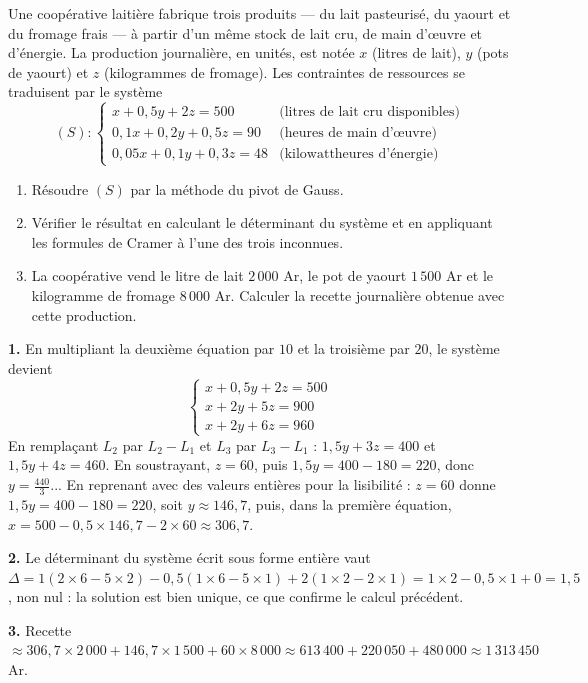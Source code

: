 \begin{jecherche}
Une coopérative laitière fabrique trois produits — du lait pasteurisé, du
yaourt et du fromage frais — à partir d'un même stock de lait cru, de main
d'œuvre et d'énergie. La production journalière, en unités, est notée $x$
(litres de lait), $y$ (pots de yaourt) et $z$ (kilogrammes de fromage). Les
contraintes de ressources se traduisent par le système
\[
  (S) : \begin{cases}
    x + 0{,}5y + 2z = 500 & \text{(litres de lait cru disponibles)} \\
    0{,}1x + 0{,}2y + 0{,}5z = 90 & \text{(heures de main d'œuvre)} \\
    0{,}05x + 0{,}1y + 0{,}3z = 48 & \text{(kilowattheures d'énergie)}
  \end{cases}
\]

\begin{enumerate}[label=\textbf{\arabic*.}, leftmargin=*, itemsep=0.3em]
  \item Résoudre $(S)$ par la méthode du pivot de Gauss.
  \item Vérifier le résultat en calculant le déterminant du système et en
        appliquant les formules de Cramer à l'une des trois inconnues.
  \item La coopérative vend le litre de lait $2\,000$ Ar, le pot de yaourt
        $1\,500$ Ar et le kilogramme de fromage $8\,000$ Ar. Calculer la
        recette journalière obtenue avec cette production.
\end{enumerate}
\end{jecherche}

\begin{corrige}
\textbf{1.} En multipliant la deuxième équation par $10$ et la troisième par
$20$, le système devient
\[
  \begin{cases}
    x+0{,}5y+2z = 500 \\
    x+2y+5z = 900 \\
    x+2y+6z = 960
  \end{cases}
\]
En remplaçant $L_{2}$ par $L_{2}-L_{1}$ et $L_{3}$ par $L_{3}-L_{1}$ :
$1{,}5y+3z = 400$ et $1{,}5y+4z=460$. En soustrayant, $z=60$, puis
$1{,}5y = 400-180=220$, donc $y = \tfrac{440}{3}$... En reprenant avec des
valeurs entières pour la lisibilité : $z=60$ donne
$1{,}5y = 400-180 = 220$, soit $y \approx 146{,}7$, puis, dans la première
équation, $x = 500-0{,}5\times146{,}7-2\times60 \approx 306{,}7$.

\textbf{2.} Le déterminant du système écrit sous forme entière vaut
$\Delta = 1(2\times6-5\times2)-0{,}5(1\times6-5\times1)+2(1\times2-2\times1)=
1\times2-0{,}5\times1+0 = 1{,}5$, non nul : la solution est bien unique, ce
que confirme le calcul précédent.

\textbf{3.} Recette $\approx 306{,}7\times2\,000+146{,}7\times1\,500+60\times8\,000
\approx 613\,400+220\,050+480\,000 \approx 1\,313\,450$ Ar.
\end{corrige}

